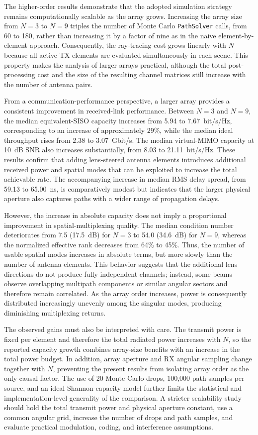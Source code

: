 The higher-order results demonstrate that the adopted simulation strategy remains computationally scalable as the array grows. Increasing the array size from $N=3$ to $N=9$ triples the number of Monte Carlo \texttt{PathSolver} calls, from 60 to 180, rather than increasing it by a factor of nine as in the naive element-by-element approach. Consequently, the ray-tracing cost grows linearly with $N$ because all active TX elements are evaluated simultaneously in each scene. This property makes the analysis of larger arrays practical, although the total post-processing cost and the size of the resulting channel matrices still increase with the number of antenna pairs.

From a communication-performance perspective, a larger array provides a consistent improvement in received-link performance. Between $N=3$ and $N=9$, the median equivalent-SISO capacity increases from 5.94 to 7.67~bit/s/Hz, corresponding to an increase of approximately 29\%, while the median ideal throughput rises from 2.38 to 3.07~Gbit/s. The median virtual-MIMO capacity at 10~dB SNR also increases substantially, from 8.03 to 21.11~bit/s/Hz. These results confirm that adding lens-steered antenna elements introduces additional received power and spatial modes that can be exploited to increase the total achievable rate. The accompanying increase in median RMS delay spread, from 59.13 to 65.00~ns, is comparatively modest but indicates that the larger physical aperture also captures paths with a wider range of propagation delays.

However, the increase in absolute capacity does not imply a proportional improvement in spatial-multiplexing quality. The median condition number deteriorates from 7.5 (17.5~dB) for $N=3$ to 54.0 (34.6~dB) for $N=9$, whereas the normalized effective rank decreases from 64\% to 45\%. Thus, the number of usable spatial modes increases in absolute terms, but more slowly than the number of antenna elements. This behavior suggests that the additional lens directions do not produce fully independent channels; instead, some beams observe overlapping multipath components or similar angular sectors and therefore remain correlated. As the array order increases, power is consequently distributed increasingly unevenly among the singular modes, producing diminishing multiplexing returns.

The observed gains must also be interpreted with care. The transmit power is fixed per element and therefore the total radiated power increases with $N$, so the reported capacity growth combines array-size benefits with an increase in the total power budget. In addition, array aperture and RX angular sampling change together with $N$, preventing the present results from isolating array order as the only causal factor. The use of 20 Monte Carlo drops, 100{,}000 path samples per source, and an ideal Shannon-capacity model further limits the statistical and implementation-level generality of the comparison. A stricter scalability study should hold the total transmit power and physical aperture constant, use a common angular grid, increase the number of drops and path samples, and evaluate practical modulation, coding, and interference assumptions.

